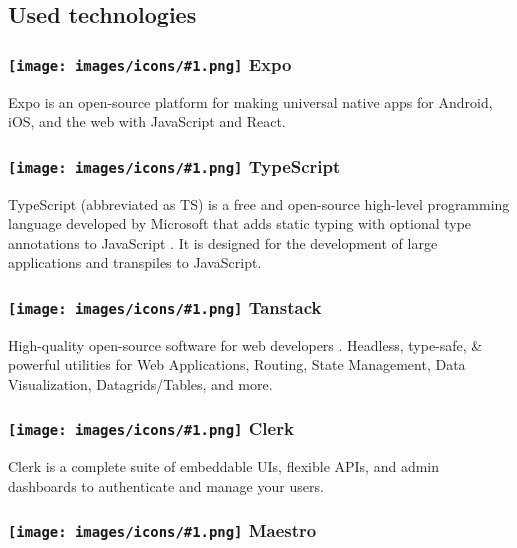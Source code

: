 \subsection{Used technologies}

\newcommand{\techicon}[1]{%
  \texttt{[image: images/icons/\#1.png]}%
}

\subsubsection*{\protect\techicon{expo} Expo}

Expo is an open-source platform for making universal native apps for Android, iOS, and the web with JavaScript and React.

\subsubsection*{\protect\techicon{typescript} TypeScript}
                                                                
TypeScript (abbreviated as TS) is a free and open-source high-level programming language developed by Microsoft that adds static typing with optional type annotations to JavaScript \cite{TypeScriptDocs2023}. It is designed for the development of large applications and transpiles to JavaScript.

\subsubsection*{\protect\techicon{tanstack} Tanstack}
                                                                      
High-quality open-source software for web developers \cite{TanstackWebsite}. Headless, type-safe, \& powerful utilities for Web Applications, Routing, State Management, Data Visualization, Datagrids/Tables, and more.

\subsubsection*{\protect\techicon{clerk} Clerk}
                                                                        
Clerk \cite{ClerkAuthenticationDocs} is a complete suite of embeddable UIs, flexible APIs, and admin dashboards to authenticate and manage your users.

\subsubsection*{\protect\techicon{maestro} Maestro}
                                                                        
